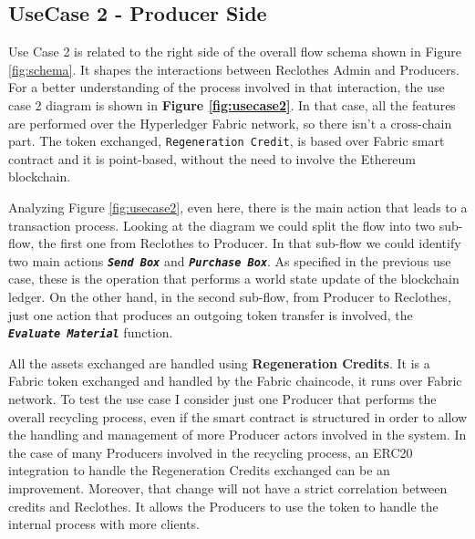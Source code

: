 \subsection{UseCase 2 - Producer Side}

Use Case 2 is related to the right side of the overall flow schema shown in Figure \ref{fig:schema}.
It shapes the interactions between Reclothes Admin and Producers. For a better understanding of the 
process involved in that interaction, the use case 2 diagram is shown in \textbf{Figure \ref{fig:usecase2}}.
In that case, all the features are performed over the Hyperledger Fabric network, so there isn't a cross-chain 
part. The token exchanged, \texttt{Regeneration Credit}, is based over Fabric smart contract and it is point-based, 
without the need to involve the Ethereum blockchain.

\bigskip 
Analyzing Figure \ref{fig:usecase2}, even here, there is the main action that leads to a transaction process. 
Looking at the diagram we could split the flow into two sub-flow, the first one from Reclothes to Producer. In 
that sub-flow we could identify two main actions \textbf{\texttt{\textit{Send Box}}} and 
\textbf{\texttt{\textit{Purchase Box}}}.  As specified in the previous use case, these is the operation that 
performs a world state update of the blockchain ledger. On the other hand, in the second sub-flow, from Producer 
to Reclothes, just one action that produces an outgoing token transfer is involved, the 
\textbf{\texttt{\textit{Evaluate Material}}} function. 

\bigskip 
All the assets exchanged are handled using \textbf{Regeneration Credits}. It is a Fabric token exchanged and 
handled by the Fabric chaincode, it runs over Fabric network. To test the use case I consider just one 
Producer that performs the overall recycling process, even if the smart contract is structured in order to 
allow the handling and management of more Producer actors involved in the system. In the case of many Producers 
involved in the recycling process, an ERC20 integration to handle the Regeneration
Credits exchanged can be an improvement. Moreover, that change will not have a strict correlation 
between credits and Reclothes. It allows the Producers to use the token to handle the internal process with 
more clients. 


